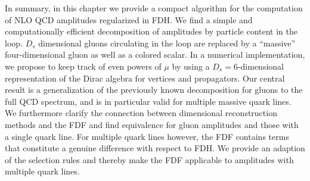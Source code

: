 In summary, in this chapter we provide a compact algorithm for the
computation of NLO QCD amplitudes regularized in FDH. We find a simple
and computationally efficient decomposition of
amplitudes by particle content in the loop. $D_s$ dimensional gluons
circulating in the loop are replaced by a ``massive'' four-dimensional
gluon as well as a colored scalar. In a numerical
implementation, we propose to keep track of even powers of $\mu$ by
using a $D_s=6$-dimensional representation of the Dirac algebra for
vertices and propagators. Our central result is a generalization of
the previously known decomposition for gluons \cite{Bern:1994cg} to the full QCD
spectrum, and is in particular valid for multiple massive quark
lines. We furthermore clarify the connection between dimensional
reconstruction methods and the FDF \cite{Fazio:2014xea} and find equivalence
for gluon amplitudes and those with a single quark line. For
multiple quark lines however, the FDF contains terms that constitute a
genuine difference with respect to FDH. We provide an adaption of the selection
rules and thereby make the FDF applicable to amplitudes with multiple
quark lines.




